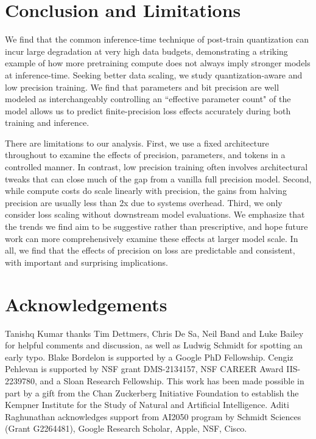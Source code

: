\documentclass[11pt]{article}
\begin{document}
\section{Conclusion and Limitations}

We find that the common inference-time technique of post-train quantization can incur large degradation at very high data budgets, demonstrating a striking example of how more pretraining compute does not always imply stronger models at inference-time. Seeking better data scaling, we study quantization-aware and low precision training. We find that parameters and bit precision are well modeled as interchangeably controlling an ``effective parameter count" of the model allows us to predict finite-precision loss effects accurately during both training and inference. 

There are limitations to our analysis. First, we use a fixed architecture throughout to examine the effects of precision, parameters, and tokens in a controlled manner. In contrast, low precision training often involves architectural tweaks \citep{ma2024era, zhu2024scalable} that can close much of the gap from a vanilla full precision model. Second, while compute costs do scale linearly with precision, the gains from halving precision are usually less than 2x due to systems overhead. Third, we only consider loss scaling without downstream model evaluations. We emphasize that the trends we find aim to be suggestive rather than prescriptive, and hope future work can more comprehensively examine these effects at larger model scale. In all, we find that the effects of precision on loss are predictable and consistent, with important and surprising implications.

\newpage 
\section{Acknowledgements}

Tanishq Kumar thanks Tim Dettmers, Chris De Sa, Neil Band and Luke Bailey for helpful comments and discussion, as well as Ludwig Schmidt for spotting an early typo. Blake Bordelon is supported by a Google PhD Fellowship. Cengiz Pehlevan is supported by NSF grant DMS-2134157, NSF CAREER Award IIS-2239780, and a Sloan Research Fellowship. This work has been made possible in part by a gift from the Chan Zuckerberg Initiative Foundation to establish the Kempner Institute for the Study of Natural and Artificial Intelligence. Aditi Raghunathan acknowledges support from AI2050 program by Schmidt Sciences (Grant G2264481), Google Research Scholar, Apple, NSF, Cisco. 
\end{document}
